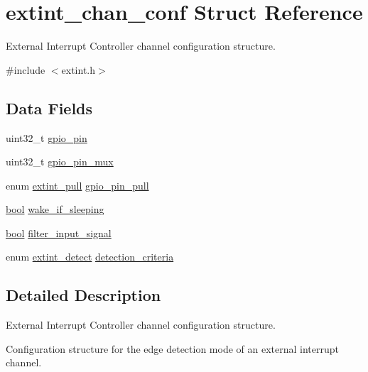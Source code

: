 \hypertarget{structextint__chan__conf}{}\section{extint\+\_\+chan\+\_\+conf Struct Reference}
\label{structextint__chan__conf}


External Interrupt Controller channel configuration structure.  




{\ttfamily \#include $<$extint.\+h$>$}

\subsection*{Data Fields}
\begin{DoxyCompactItemize}
\item 
uint32\+\_\+t \mbox{\hyperlink{structextint__chan__conf_aaa3ba20871e508028b08eed10d08db84}{gpio\+\_\+pin}}
\item 
uint32\+\_\+t \mbox{\hyperlink{structextint__chan__conf_ab223c84d8e5b59e9fcc8673c338a7a87}{gpio\+\_\+pin\+\_\+mux}}
\item 
enum \mbox{\hyperlink{group__asfdoc__sam0__extint__group_ga01b49a5a87ca71359c5a9bc2ee02853e}{extint\+\_\+pull}} \mbox{\hyperlink{structextint__chan__conf_a2722ba2735f217f3c7e30f2e4135c134}{gpio\+\_\+pin\+\_\+pull}}
\item 
\mbox{\hyperlink{group__group__sam0__utils_ga97a80ca1602ebf2303258971a2c938e2}{bool}} \mbox{\hyperlink{structextint__chan__conf_a5b60cacd31d57bf5bafafcdf22594ac7}{wake\+\_\+if\+\_\+sleeping}}
\item 
\mbox{\hyperlink{group__group__sam0__utils_ga97a80ca1602ebf2303258971a2c938e2}{bool}} \mbox{\hyperlink{structextint__chan__conf_a1a59d546b8bc80f31e5350a490c5b718}{filter\+\_\+input\+\_\+signal}}
\item 
enum \mbox{\hyperlink{group__asfdoc__sam0__extint__group_ga920ab9931e047b548d07ad29dedfcca2}{extint\+\_\+detect}} \mbox{\hyperlink{structextint__chan__conf_a275ebcf2d5de2b96132c05744345a34c}{detection\+\_\+criteria}}
\end{DoxyCompactItemize}


\subsection{Detailed Description}
External Interrupt Controller channel configuration structure. 

Configuration structure for the edge detection mode of an external interrupt channel. 

